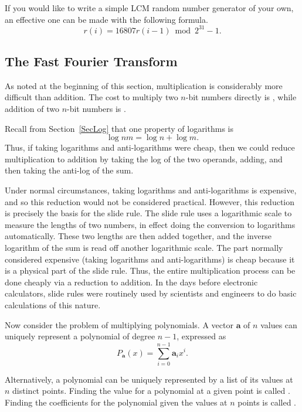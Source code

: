 If you would like to write a simple LCM random number generator of
your own, an effective one can be made with the following formula.
\[ r(i) = 16807 r(i-1) \bmod 2^{31} - 1.\]

\subsection{The Fast Fourier Transform}
\label{sec:FFT}

As noted at the beginning of this section, multiplication is
considerably more difficult than addition.
The cost to multiply two \(n\)-bit numbers directly is \Ontwo,
while addition of two \(n\)-bit numbers is \On.

Recall from Section~\ref{SecLog} that one property of logarithms is
\[\log nm = \log n + \log m.\]
\noindent
Thus, if taking logarithms and anti-logarithms were cheap, then we
could reduce multiplication to addition by taking the log of the two
operands, adding, and then taking the anti-log of the sum.

Under normal circumstances, taking logarithms and anti-logarithms is
expensive, and so this reduction would not be considered practical.
However, this reduction is precisely the basis for the
slide rule.
The slide rule uses a logarithmic scale to measure the lengths of two
numbers, in effect doing the conversion to logarithms automatically.
These two lengths are then added together, and the inverse logarithm
of the sum is read off another logarithmic scale.
The part normally considered expensive (taking logarithms and
anti-logarithms) is cheap because it is a physical part of the
slide rule.
Thus, the entire multiplication process can be done cheaply via a
reduction to addition.
In the days before electronic calculators, slide rules were routinely
used by scientists and engineers to do basic calculations of this
nature.

Now consider the problem of  multiplying polynomials.
A vector $\mathbf a$ of $n$ values can uniquely represent a polynomial
of degree $n-1$, expressed as
\[P_{\mathbf a}(x) = \sum_{i=0}^{n-1} {\mathbf a}_i x^i.\]

\noindent Alternatively, a polynomial can be uniquely represented by a
list of its values at $n$ distinct points.
Finding the value for a polynomial at a given point is called
.
Finding the coefficients for the polynomial given the values at
$n$ points is called .

